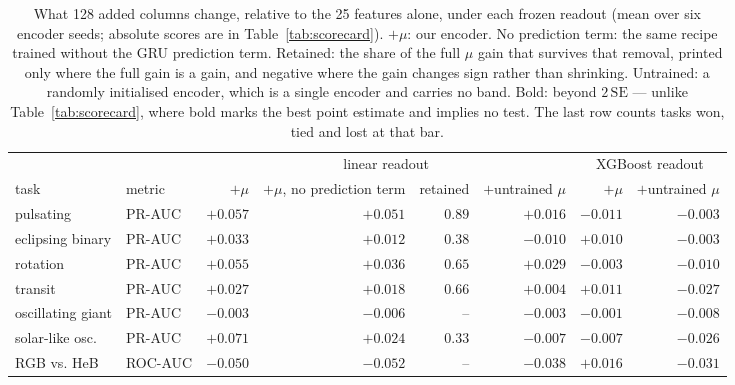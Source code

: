 \documentclass{article}
\begin{document}
\begin{table}[H]
\caption{What 128 added columns change, relative to the 25 features alone, under each frozen readout
(mean over six encoder seeds; absolute scores are in Table~\ref{tab:scorecard}). $+\mu$: our encoder.
No prediction term: the same recipe trained without the GRU prediction term. Retained: the share of
the full $\mu$ gain that survives that removal, printed only where the full gain is a gain, and
negative where the gain changes sign rather than shrinking. Untrained: a randomly
initialised encoder, which is a single encoder and carries no band. Bold: beyond $2\,\mathrm{SE}$ ---
unlike Table~\ref{tab:scorecard}, where bold marks the best point estimate and implies no test. The
last row counts tasks won, tied and lost at that bar.}
\label{tab:readout}
\centering
\scriptsize
\begin{tabular}{llrrrrrr}
\toprule
 & & \multicolumn{4}{c}{linear readout} & \multicolumn{2}{c}{XGBoost readout} \\
\cmidrule(lr){3-6}\cmidrule(lr){7-8}
task & metric & $+\mu$ & $+\mu$, no prediction term & retained & $+$untrained $\mu$ & $+\mu$ & $+$untrained $\mu$ \\
\midrule
pulsating & PR-AUC & $\boldsymbol{+}\mathbf{0.057}$ & $\boldsymbol{+}\mathbf{0.051}$ & $0.89$ & ${+}0.016$ & ${-}0.011$ & ${-}0.003$ \\
eclipsing binary & PR-AUC & $\boldsymbol{+}\mathbf{0.033}$ & $\boldsymbol{+}\mathbf{0.012}$ & $0.38$ & ${-}0.010$ & $\boldsymbol{+}\mathbf{0.010}$ & ${-}0.003$ \\
rotation & PR-AUC & $\boldsymbol{+}\mathbf{0.055}$ & $\boldsymbol{+}\mathbf{0.036}$ & $0.65$ & ${+}0.029$ & $\boldsymbol{-}\mathbf{0.003}$ & ${-}0.010$ \\
transit & PR-AUC & $\boldsymbol{+}\mathbf{0.027}$ & $\boldsymbol{+}\mathbf{0.018}$ & $0.66$ & ${+}0.004$ & ${+}0.011$ & ${-}0.027$ \\
oscillating giant & PR-AUC & $\boldsymbol{-}\mathbf{0.003}$ & $\boldsymbol{-}\mathbf{0.006}$ & -- & ${-}0.003$ & ${-}0.001$ & ${-}0.008$ \\
solar-like osc. & PR-AUC & $\boldsymbol{+}\mathbf{0.071}$ & $\boldsymbol{+}\mathbf{0.024}$ & $0.33$ & ${-}0.007$ & ${-}0.007$ & ${-}0.026$ \\
RGB vs. HeB & ROC-AUC & $\boldsymbol{-}\mathbf{0.050}$ & $\boldsymbol{-}\mathbf{0.052}$ & -- & ${-}0.038$ & $\boldsymbol{+}\mathbf{0.016}$ & ${-}0.031$ \\

\end{tabular}
\end{table}
\end{document}
